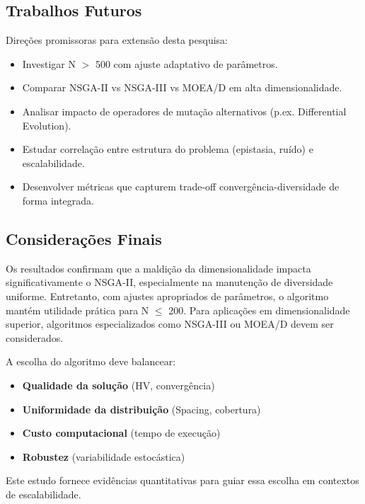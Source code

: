 \subsection{Trabalhos Futuros}
Direções promissoras para extensão desta pesquisa:
\begin{itemize}
  \item Investigar N $>$ 500 com ajuste adaptativo de parâmetros.
  \item Comparar NSGA-II vs NSGA-III vs MOEA/D em alta dimensionalidade.
  \item Analisar impacto de operadores de mutação alternativos (p.ex. Differential Evolution).
  \item Estudar correlação entre estrutura do problema (epistasia, ruído) e escalabilidade.
  \item Desenvolver métricas que capturem trade-off convergência-diversidade de forma integrada.
\end{itemize}

\subsection{Considerações Finais}
Os resultados confirmam que a maldição da dimensionalidade impacta significativamente o NSGA-II, especialmente na manutenção de diversidade uniforme. Entretanto, com ajustes apropriados de parâmetros, o algoritmo mantém utilidade prática para N $\leq$ 200. Para aplicações em dimensionalidade superior, algoritmos especializados como NSGA-III ou MOEA/D devem ser considerados.

A escolha do algoritmo deve balancear:
\begin{itemize}
  \item \textbf{Qualidade da solução} (HV, convergência)
  \item \textbf{Uniformidade da distribuição} (Spacing, cobertura)
  \item \textbf{Custo computacional} (tempo de execução)
  \item \textbf{Robustez} (variabilidade estocástica)
\end{itemize}

Este estudo fornece evidências quantitativas para guiar essa escolha em contextos de escalabilidade.